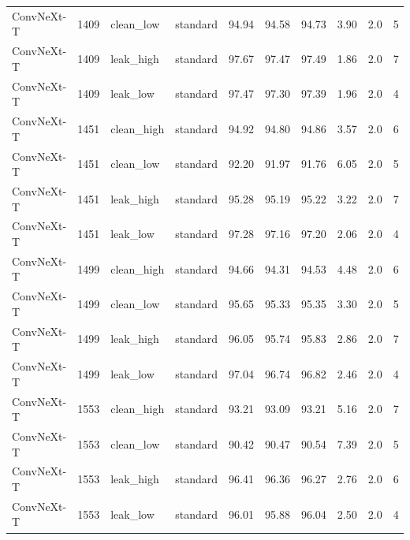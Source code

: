 {\begin{longtable}{lrllrrrrrr}
ConvNeXt-T & 1409 & clean\_low & standard & 94.94 & 94.58 & 94.73 & 3.90 & 2.0 & 5 \\
ConvNeXt-T & 1409 & leak\_high & standard & 97.67 & 97.47 & 97.49 & 1.86 & 2.0 & 7 \\
ConvNeXt-T & 1409 & leak\_low & standard & 97.47 & 97.30 & 97.39 & 1.96 & 2.0 & 4 \\
ConvNeXt-T & 1451 & clean\_high & standard & 94.92 & 94.80 & 94.86 & 3.57 & 2.0 & 6 \\
ConvNeXt-T & 1451 & clean\_low & standard & 92.20 & 91.97 & 91.76 & 6.05 & 2.0 & 5 \\
ConvNeXt-T & 1451 & leak\_high & standard & 95.28 & 95.19 & 95.22 & 3.22 & 2.0 & 7 \\
ConvNeXt-T & 1451 & leak\_low & standard & 97.28 & 97.16 & 97.20 & 2.06 & 2.0 & 4 \\
ConvNeXt-T & 1499 & clean\_high & standard & 94.66 & 94.31 & 94.53 & 4.48 & 2.0 & 6 \\
ConvNeXt-T & 1499 & clean\_low & standard & 95.65 & 95.33 & 95.35 & 3.30 & 2.0 & 5 \\
ConvNeXt-T & 1499 & leak\_high & standard & 96.05 & 95.74 & 95.83 & 2.86 & 2.0 & 7 \\
ConvNeXt-T & 1499 & leak\_low & standard & 97.04 & 96.74 & 96.82 & 2.46 & 2.0 & 4 \\
ConvNeXt-T & 1553 & clean\_high & standard & 93.21 & 93.09 & 93.21 & 5.16 & 2.0 & 7 \\
ConvNeXt-T & 1553 & clean\_low & standard & 90.42 & 90.47 & 90.54 & 7.39 & 2.0 & 5 \\
ConvNeXt-T & 1553 & leak\_high & standard & 96.41 & 96.36 & 96.27 & 2.76 & 2.0 & 6 \\
ConvNeXt-T & 1553 & leak\_low & standard & 96.01 & 95.88 & 96.04 & 2.50 & 2.0 & 4 \\
\end{longtable}
}
